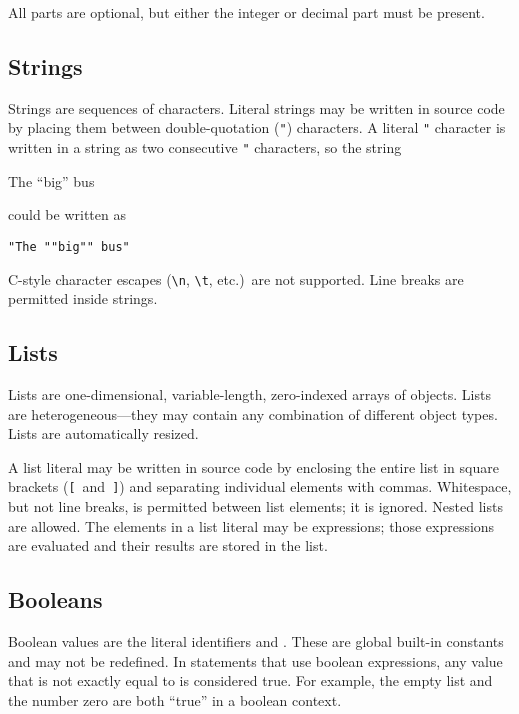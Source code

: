 All parts are optional, but either the integer or decimal part must be
present.


\subsection{Strings}
\label{strings}

Strings are sequences of  characters.  Literal strings may
be written in source code by placing them between double-quotation
(\verb+"+) characters.  A literal \verb+"+ character is written in a
string as two consecutive \verb+"+ characters, so the string

\begin{example}
The ``big'' bus
\end{example}

\noindent
could be written as 

\begin{example}
\verb+"The ""big"" bus"+
\end{example}

\noindent
C-style character escapes (\verb+\n+, \verb+\t+, etc.)\ are not
supported.  Line breaks are permitted inside strings.


\subsection{Lists}
\label{lists}

Lists are one-dimensional, variable-length, zero-indexed arrays of
objects.  Lists are heterogeneous---they may contain any combination
of different object types.  Lists are automatically resized.

A list literal may be written in source code by enclosing the entire
list in square brackets (\verb+[+~and~\verb+]+) and separating
individual elements with commas.  Whitespace, but not line breaks, is
permitted between list elements; it is ignored.  Nested lists are
allowed.  The elements in a list literal may be expressions; those
expressions are evaluated and their results are stored in the list.




\subsection{Booleans}
\label{booleans}

Boolean values are the literal identifiers  and .
These are global built-in constants and may not be redefined.  In
statements that use boolean expressions, any value that is not exactly
equal to  is considered true.  For example, the empty list
and the number zero are both ``true'' in a boolean context.



